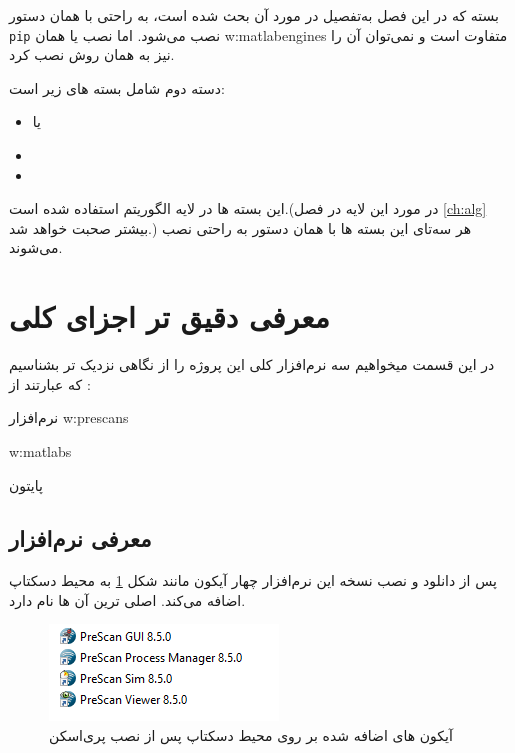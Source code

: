 بسته  که در این فصل به‌تفصیل در مورد آن بحث شده است، به راحتی با همان دستور \texttt{pip} نصب می‌شود. اما نصب 
یا همان
\glspl{w:matlabengine}
متفاوت است و نمی‌توان آن را نیز به همان روش نصب کرد.

دسته دوم شامل بسته های زیر است:
\begin{itemize}
	\item {} یا 
	\item {}
	\item {}
	
\end{itemize}

این بسته ها در لایه الگوریتم استفاده شده است.(در مورد این لایه در فصل 
\ref{ch:alg}
بیشتر صحبت خواهد شد.)
هر سه‌تای این بسته ها با همان دستور  به راحتی نصب می‌شوند.



\section{معرفی دقیق تر اجزای کلی}
در این قسمت میخواهیم سه نرم‌افزار کلی این پروژه را از نگاهی نزدیک تر  بشناسیم که عبارتند از :
\begin{enuminline}
	\item 
	نرم‌افزار 
	\glspl{w:prescan}
	\item 
	\glspl{w:matlab}
	\item پایتون
\end{enuminline}

\subsection{معرفی نرم‌افزار 
}

پس از دانلود و نصب نسخه  این نرم‌افزار چهار آیکون مانند شکل 
\ref{fig:prescan-icons}
به محیط دسکتاپ اضافه می‌کند.  اصلی ترین آن ها 
نام دارد.

\begin{figure}[h]
	\centering
	\includegraphics[width=0.4\linewidth]{Figures/prescan-icons}
	\caption{آیکون های اضافه شده بر روی محیط دسکتاپ پس از نصب پری‌اسکن}
	\label{fig:prescan-icons}
\end{figure}

